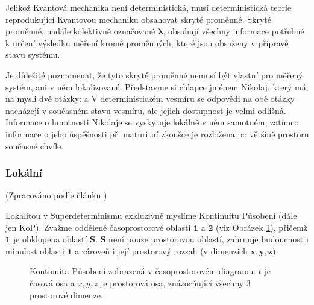 Jelikož Kvantová mechanika není deterministická, musí deterministická teorie reprodukující Kvantovou mechaniku obsahovat skryté proměnné. Skryté proměnné, nadále kolektivně označované $\bm{\lambda}$, obsahují všechny informace potřebné k určení výsledku měření kromě  proměnných, které jsou obsaženy v přípravě stavu systému.

Je důležité poznamenat, že tyto skryté proměnné nemusí být vlastní pro měřený systém, ani v něm lokalizované. Představme si chlapce jménem Nikolaj, který má na mysli dvě otázky:  a  V deterministickém vesmíru se odpovědi na obě otázky nacházejí v současném stavu vesmíru, ale jejich dostupnost je velmi odlišná. Informace o hmotnosti Nikolaje se vyskytuje lokálně v něm samotném, zatímco informace o jeho úspěšnosti při maturitní zkoušce je rozložena po většině prostoru současné chvíle.

\subsubsection{Lokální}
(Zpracováno podle článku \cite{CoA})

Lokalitou v Superdeterminismu exkluzivně myslíme Kontinuitu Působení (dále jen KoP). Zvažme oddělené časoprostorové oblasti $\bm{1}$ a $\bm{2}$ (viz Obrázek \ref{fig:7}), přičemž $\bm{1}$ je obklopena  oblastí $\bm{S}$. $\bm{S}$ není pouze prostorovou oblastí, zahrnuje budoucnost i minulost oblasti $\bm{1}$ a zároveň i její prostorový rozsah (v dimenzích $\bm{x,y,z}$).

\begin{figure}[ht]

    \centering

    \caption{\label{fig:7}Kontinuita Působení zobrazená v časoprostorovém diagramu. $t$ je časová osa a $x,y,z$ je prostorová osa, znázorňující všechny 3 prostorové dimenze.}
\end{figure}

